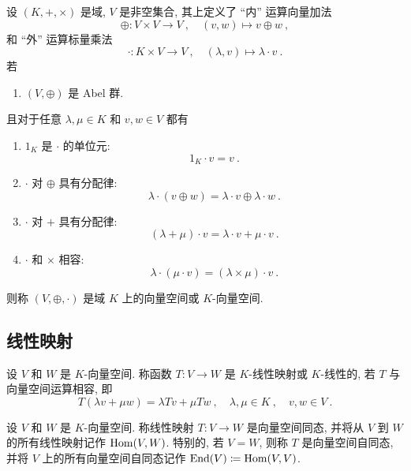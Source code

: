 \begin{axiom}[向量空间]
    设 \((K, +, \times)\) 是域, \(V\) 是非空集合, 其上定义了 ``内'' 运算向量加法
    \[
        \oplus \colon V \times V \to V\ ,\quad (v, w) \mapsto v \oplus w\ ,
    \]
    和 ``外'' 运算标量乘法
    \[
        \cdot \colon K \times V \to V\ ,\quad (\lambda, v) \mapsto \lambda \cdot v\ .
    \]
    若
    \begin{enumerate}[label={\((\mathrm{VS}_{\arabic*})\)}]
        \item \((V, \oplus)\) 是 Abel 群.
    \end{enumerate}
    且对于任意 \(\lambda, \mu \in K\) 和 \(v, w \in V\) 都有
    \begin{enumerate}[label={\((\mathrm{VS}_{\arabic*})\)},start=2]
        \item \(1_K\) 是 \(\cdot\) 的单位元:
        \[
            1_K \cdot v = v\ .
        \]
        \item \(\cdot\) 对 \(\oplus\) 具有分配律:
        \[
            \lambda \cdot (v \oplus w) = \lambda \cdot v \oplus \lambda \cdot w\ .
        \]
        \item \(\cdot\) 对 \(+\) 具有分配律:
        \[
            (\lambda + \mu) \cdot v = \lambda \cdot v + \mu \cdot v\ .
        \]
        \item \(\cdot\) 和 \(\times\) 相容:
        \[
            \lambda \cdot (\mu \cdot v) = (\lambda \times \mu) \cdot v\ .
        \]
    \end{enumerate}
    则称 \((V, \oplus, \cdot)\) 是域 \(K\) 上的向量空间或 \(K\)-向量空间.
\end{axiom}

\subsection{线性映射}

\begin{definition}[线性映射]
    设 \(V\) 和 \(W\) 是 \(K\)-向量空间. 称函数 \(T \colon V \to W\) 是 \(K\)-线性映射或 \(K\)-线性的, 若 \(T\) 与向量空间运算相容, 即
    \[
        T(\lambda v + \mu w) = \lambda T v + \mu T w\ ,\quad \lambda, \mu \in K\ ,\quad v, w \in V\ .
    \]
\end{definition}

\begin{definition}[向量空间同态]
    设 \(V\) 和 \(W\) 是 \(K\)-向量空间. 称线性映射 \(T \colon V \to W\) 是向量空间同态, 并将从 \(V\) 到 \(W\) 的所有线性映射记作 \(\operatorname{Hom}(V, W)\). 
    特别的, 若 \(V = W\), 则称 \(T\) 是向量空间自同态, 并将 \(V\) 上的所有向量空间自同态记作 \(\operatorname{End}(V) \coloneqq \operatorname{Hom}(V, V)\).
\end{definition}

